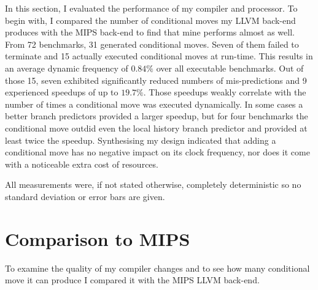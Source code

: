 \documentclass[12pt,twoside,notitlepage]{report}
\begin{document}
In this section, I evaluated the performance of my compiler and processor. To begin with, I compared the number of conditional moves my LLVM back-end produces with the MIPS back-end to find that mine performs almost as well. From 72 benchmarks, 31 generated conditional moves. Seven of them failed to terminate and 15 actually executed conditional moves at run-time. 
This results in an average dynamic frequency of $0.84\%$ over all executable benchmarks. Out of those 15, seven exhibited significantly reduced numbers of mis-predictions and 9 experienced speedups of up to $19.7\%$. Those speedups weakly correlate with the number of times a conditional move was executed dynamically. In some cases a better branch predictors provided a larger speedup, but for four benchmarks the conditional move outdid even the local history branch predictor and provided at least twice the speedup. Synthesising my design indicated that adding a conditional move has no negative impact on its clock frequency, nor does it come with a noticeable extra cost of resources.

All measurements were, if not stated otherwise, completely deterministic so no standard deviation or error bars are given.


\section{Comparison to MIPS}

To examine the quality of my compiler changes and to see how many conditional move it can produce I compared it with the MIPS LLVM back-end. %
\end{document}
